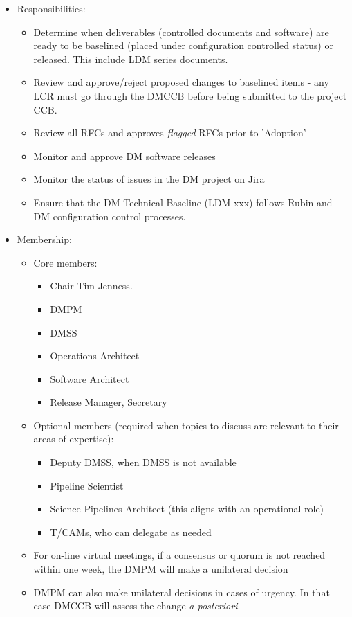 \begin{itemize}
\item Responsibilities:
        \begin{itemize}
        \item Determine when deliverables (controlled documents and software) are ready to be baselined (placed under configuration controlled status) or released. This include LDM series documents.
        \item Review and approve/reject proposed changes to baselined items - any LCR must go through the DMCCB before being submitted to the project CCB.
        \item Review all RFCs and approves \textit{flagged} RFCs prior to 'Adoption'
        \item Monitor and approve DM software releases
        \item Monitor the status of issues in the DM project on Jira
        \item Ensure that the DM Technical Baseline (LDM-xxx) follows Rubin and DM configuration control processes.
        \end{itemize}
\item Membership:
        \begin{itemize}
        \item Core members:
                \begin{itemize}
                \item Chair Tim Jenness.
                \item \gls{DMPM}
                \item \gls{DMSS}
                \item Operations Architect
                \item Software Architect
                \item Release Manager, Secretary
                \end{itemize}
        \item Optional members (required when topics to discuss are relevant to their areas of expertise):
                \begin{itemize}
                \item Deputy \gls{DMSS}, when \gls{DMSS} is not available
                \item Pipeline Scientist
		\item Science Pipelines Architect (this aligns with an operational role)%
                \item \glspl{T/CAM}, who can delegate as needed
                \end{itemize}
	\item For on-line virtual meetings, if a consensus or quorum is not reached within one week, the \gls{DMPM} will make a unilateral decision
        \item \gls{DMPM} can also make unilateral decisions in cases of urgency. In that case DMCCB will assess the change \textit{a posteriori}.
	\end{itemize}
\end{itemize}

